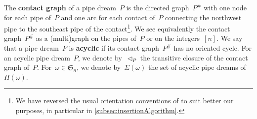 \documentclass[reqno]{amsart}
\theoremstyle{definition}
\newcommand{\N}{\mathbb{N}} %
\newcommand{\eqdef}{\mbox{\,\raisebox{0.2ex}{\scriptsize\ensuremath{\mathrm:}}\ensuremath{=}\,}} %
\newcommand{\defn}[1]{\textbf{\textsf{\color{PineGreen} #1}}} %
\newcommand{\vincent}[1]{\todo[color=blue!30]{#1 \\ \hfill --- V.}}
\newcommand{\fS}{\mathfrak{S}} %
\newcommand{\pipeDreams}{\Pi} %
\newcommand{\contact}{^\#} %
\newcommand{\acyclicPipeDreams}{\Sigma} %
\newcommand{\less}{\vartriangleleft} %
\newcommand{\contactLess}[1]{\less_{#1}} %
\begin{document}
The \defn{contact graph} of a pipe dream~$P$ is the directed graph~$P\contact$ with one node for each pipe of~$P$ and one arc for each contact of~$P$ connecting the northwest pipe to the southeast pipe of the contact\footnote{We have reversed the usual orientation conventions of \cite{PilaudSantos-brickPolytope, PilaudPocchiola, Pilaud-brickAlgebra} to suit better our purposes, in particular in \cref{subsec:insertionAlgorithm}.}.
We see equivalently the contact graph~$P\contact$ as a (multi)graph on the pipes of~$P$ or on the integers~$[n]$.
We say that a pipe dream~$P$ is \defn{acyclic} if its contact graph~$P\contact$ has no oriented cycle.
For an acyclic pipe dream~$P$, we denote by~$\contactLess{P}$ the transitive closure of the contact graph of~$P$.
For~$\omega \in \fS_n$, we denote by~$\acyclicPipeDreams(\omega)$ the set of acyclic pipe dreams of~$\pipeDreams(\omega)$.
\end{document}
